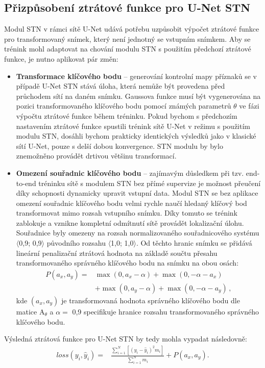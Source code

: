 \subsection{Přizpůsobení ztrátové funkce pro U-Net STN}
\label{subsec:Chapter474_stn_loss}

Modul STN v rámci sítě U-Net udává potřebu uzpůsobit výpočet ztrátové funkce pro transformovaný snímek, který není jednotný se vstupním snímkem. Aby se trénink mohl adaptovat na chování modulu STN s použitím předchozí ztrátové funkce, je nutno aplikovat pár změn:
\begin{itemize}
    \item \textbf{Transformace klíčového bodu} -- generování kontrolní mapy příznaků se v případě U-Net STN stává úloha, která nemůže být provedena před průchodem sítí na daném snímku. Gaussova funkce musí být vygenerována na pozici transformovaného klíčového bodu pomocí známých parametrů $\theta$ ve fázi výpočtu ztrátové funkce během tréninku. Pokud bychom s předchozím nastavením ztrátové funkce spustili trénink sítě U-Net v režimu s použitím modulu STN, dosáhli bychom prakticky identických výsledků jako v klasické sítí U-Net, pouze s delší dobou konvergence. STN modulu by bylo znemožněno provádět drtivou většinu transformací.
    \item \textbf{Omezení souřadnic klíčového bodu} -- zajímavým důsledkem při tzv. end-to-end tréninku sítě s modulem STN bez přímé supervize je možnost přeučení díky schopnosti dynamicky upravit vstupní data. Modul STN se bez aplikace omezení souřadnic klíčového bodu velmi rychle naučí hledaný klíčový bod transformovat mimo rozsah vstupního snímku. Díky tomuto se trénink zablokuje a vznikne kompletní odmítnutí sítě provádět lokalizační úlohu. Souřadnice byly omezeny na rozsah normalizovaného souřadnicového systému $\langle$0,9; 0,9$\rangle$ původního rozsahu $\langle$1,0; 1,0$\rangle$. Od těchto hranic snímku se přidává lineární penalizační ztrátová hodnota na základě součtu přesahu transformovaného správného klíčového bodu na snímku na obou osách:
    \begin{equation}
    \begin{aligned}
    P(a_x, a_y) = & \max(0, a_x - \alpha) + \max(0, -\alpha - a_x) \\
                  & + \max(0, a_y - \alpha) + \max(0, -\alpha - a_y)\,,
    \end{aligned}
    \end{equation}
    kde $(a_x, a_y)$ je transformovaná hodnota správného klíčového bodu dle matice ${\displaystyle \mathrm {A} }_\theta$ a $\alpha =$ 0,9 specifikuje hranice rozsahu transformovaného správného klíčového bodu.
    
\end{itemize}

Výsledná ztrátová funkce pro U-Net STN by tedy mohla vypadat následovně:
\begin{equation}
\begin{aligned}
loss(y_i, \hat{y}_i) = & \frac{\sum_{i=1}^{N} [(y_i - \hat{y}_i)^2 m_i]}{\sum_{i=1}^{N} m_i} + P(a_x, a_y).
\end{aligned}
\end{equation}

\endinput